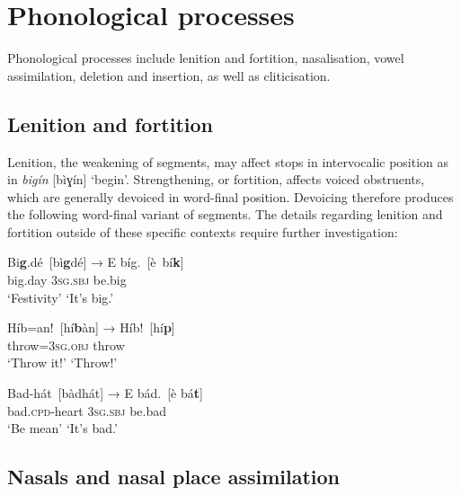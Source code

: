 \section{Phonological processes}\label{sec:2.5}

Phonological processes include lenition and fortition, nasalisation, vowel assimilation, deletion and insertion, as well as cliticisation.

\subsection{Lenition and fortition}\label{sec:2.5.1}

Lenition, the weakening of segments, may affect stops in intervocalic position as in \textit{bigín} [bìɣín] ‘begin’. Strengthening, or fortition, affects voiced obstruents, which are generally devoiced in word-final position. Devoicing therefore produces the following word-final variant of segments. The details regarding lenition and fortition outside of these specific contexts require further investigation:


\begin{exe}\ex
    \label{ex:key:24}
    \glll   Bi\textbf{g}.dé~[bì\textbf{g}dé]      →    E    bíg.~[è~bí\textbf{k}]\\
big.day   {}  \textsc{3sg.sbj}  be.big\\
‘Festivity’  {}  {‘It’s big.’}  \\
\glt
\end{exe}


\begin{exe}\ex
    \label{ex:key:25}
    \glll   Híb=an!~[hí\textbf{b}àn]      →    Híb!~[hí\textbf{p}]\\
throw=\textsc{3sg.obj}  {}  throw\\
{‘Throw it!’}  {}  ‘Throw!’  \\
\end{exe}

\begin{exe}\ex
    \label{ex:key:26}
    \glll   Bad-hát~[bàdhát]      →    E    bád.~[è  bá\textbf{t}]\\
bad.\textsc{cpd}{}-heart     {}       \textsc{3sg.sbj}  be.bad\\
{‘Be mean’}  {}  {‘It’s bad.’}  \\
\end{exe}

\subsection{Nasals and nasal place assimilation}\label{sec:2.5.2}

